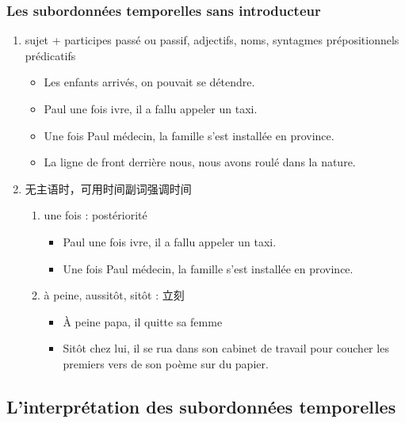 \documentclass[UTF8]{report}
\begin{document}
\subsubsection{Les subordonnées temporelles sans introducteur}
\begin{enumerate}
    \item sujet + participes passé ou passif, adjectifs, noms, syntagmes prépositionnels prédicatifs
    \begin{itemize}
        \item Les enfants arrivés, on pouvait se détendre.
        \item Paul une fois ivre, il a fallu appeler un taxi.
        \item Une fois Paul médecin, la famille s’est installée en province.
        \item La ligne de front derrière nous, nous avons roulé dans la nature.
    \end{itemize}
    \item 无主语时，可用时间副词强调时间
    \begin{enumerate}
        \item une fois : postériorité
        \begin{itemize}
            \item Paul une fois ivre, il a fallu appeler un taxi.
            \item Une fois Paul médecin, la famille s’est installée en province.
        \end{itemize}
        \item à peine, aussitôt, sitôt : 立刻
        \begin{itemize}
            \item À peine papa, il quitte sa femme
            \item Sitôt chez lui, il se rua dans son cabinet de travail pour coucher les premiers vers de son poème sur du papier. 
        \end{itemize}
    \end{enumerate}
\end{enumerate}

\subsection{L’interprétation des subordonnées temporelles}
\end{document}
